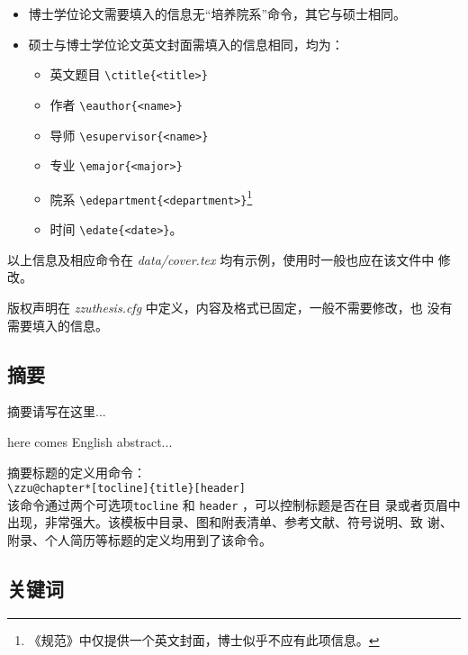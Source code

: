 \begin{itemize}
\begin{itemize}
  \end{itemize}
\item 博士学位论文需要填入的信息无“培养院系”命令，其它与硕士相同。
\item 硕士与博士学位论文英文封面需填入的信息相同，均为：
  \begin{itemize}
    \item 英文题目 \verb|\ctitle{<title>}|
    \item 作者 \verb|\eauthor{<name>}|
    \item 导师 \verb|\esupervisor{<name>}|
    \item 专业 \verb|\emajor{<major>}|
    \item 院系 \verb|\edepartment{<department>}|\footnote{《规范》中仅提供一个英文封面，博士似乎不应有此项信息。
}
    \item 时间 \verb|\edate{<date>}|。
  \end{itemize}
\end{itemize}
以上信息及相应命令在 \emph{data/cover.tex} 均有示例，使用时一般也应在该文件中
修改。%

版权声明在 \emph{zzuthesis.cfg} 中定义，内容及格式已固定，一般不需要修改，也
没有需要填入的信息。

\subsection*{摘要}

\begin{code}
\begin{cabstract}
 摘要请写在这里...
\end{cabstract}
\begin{eabstract}
 here comes English abstract...
\end{eabstract}
\end{code}

摘要标题的定义用命令：\\
\verb|\zzu@chapter*[tocline]{title}[header]|\\\noindent
该命令通过两个可选项\texttt{tocline} 和 \texttt{header} ，可以控制标题是否在目
录或者页眉中出现，非常强大。该模板中目录、图和附表清单、参考文献、符号说明、致
谢、附录、个人简历等标题的定义均用到了该命令。

\subsection*{关键词}

